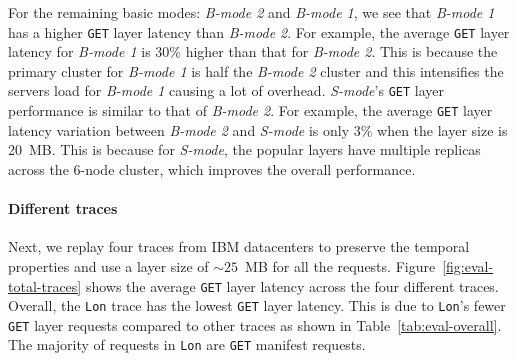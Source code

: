 For the remaining basic modes: \emph{B-mode 2} and \emph{B-mode 1}, we see that
\emph{B-mode 1} has a higher \texttt{GET} layer latency than \emph{B-mode 2}.
%
For example, the average \texttt{GET} layer latency for \emph{B-mode 1} is 30\%
higher than that for \emph{B-mode 2}.
This is because the primary cluster for \emph{B-mode 1} is half the \emph{B-mode 2}
cluster and this intensifies the servers load for \emph{B-mode 1}
causing a lot of overhead.
\emph{S-mode}'s \texttt{GET} layer performance is similar to that of \emph{B-mode 2}.
%
For example, the average \texttt{GET} layer latency variation between
\emph{B-mode 2} and \emph{S-mode} is only 3\% when the layer size is 20~MB.
%
This is because for \emph{S-mode}, the popular layers have multiple replicas
across the 6-node cluster, which improves the overall performance.


\paragraph{Different traces} Next, we replay four traces from IBM datacenters
to preserve the temporal properties and use a layer size of $\sim25$~MB
for all the requests.
%
Figure~\ref{fig:eval-total-traces} shows
the average \texttt{GET} layer latency across the four different traces.
%
Overall, the \texttt{Lon} trace has the lowest \texttt{GET} layer latency.
%
This is due to \texttt{Lon}'s fewer \texttt{GET} layer requests compared to
other traces as shown in Table~\ref{tab:eval-overall}. 
%
The majority of
requests in \texttt{Lon} are \texttt{GET} manifest requests.




